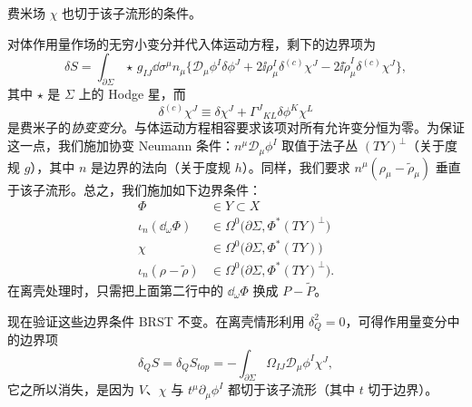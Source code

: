
费米场 $\chi$ 也切于该子流形的条件。

对体作用量作场的无穷小变分并代入体运动方程，剩下的边界项为
\[
\delta S=\int_{\partial\Sigma}\star\,g_{IJ}\dd\sigma^\mu n_\mu\Big\{\mathcal{D}_\mu\phi^I\delta\phi^J+2\ii\rho^I_\mu\delta^{(c)}\chi^J-2\ii\tilde\rho^I_\mu\delta^{(c)}\chi^J\Big\},
\]
其中 $\star$ 是 $\Sigma$ 上的 Hodge 星，而
\[
\delta^{(c)}\chi^J\equiv\delta\chi^J+\Gamma^J{}_{KL}\delta\phi^K\chi^L
\]
是费米子的\emph{协变变分}。与体运动方程相容要求该项对所有允许变分恒为零。为保证这一点，我们施加协变 Neumann 条件：$n^\mu\mathcal{D}_\mu\phi^I$ 取值于法子丛 $(TY)^\perp$（关于度规 $g$），其中 $n$ 是边界的法向（关于度规 $h$）。同样，我们要求 $n^\mu(\rho_\mu-\tilde\rho_\mu)$ 垂直于该子流形。总之，我们施加如下边界条件：
\begin{equation}
\begin{aligned}
\Phi&\in Y\subset X\\
\iota_n(\dd_\omega\Phi)&\in\Omega^0\big(\partial\Sigma,\Phi^*(TY)^\perp\big)\\
\chi&\in\Omega^0\big(\partial\Sigma,\Phi^*(TY)\big)\\
\iota_n(\rho-\tilde\rho)&\in\Omega^0\big(\partial\Sigma,\Phi^*(TY)^\perp\big).
\end{aligned} \tag{7.9}
\end{equation}
在离壳处理时，只需把上面第二行中的 $\dd_\omega\Phi$ 换成 $P-\tilde P$。

现在验证这些边界条件 BRST 不变。在离壳情形利用 $\delta_Q^2=0$，可得作用量变分中的边界项
\[
\delta_QS=\delta_QS_{top}=-\int_{\partial\Sigma}\Omega_{IJ}\mathcal{D}_\mu\phi^I\chi^J,
\]
它之所以消失，是因为 $V$、$\chi$ 与 $t^\mu\partial_\mu\phi^I$ 都切于该子流形（其中 $t$ 切于边界）。

